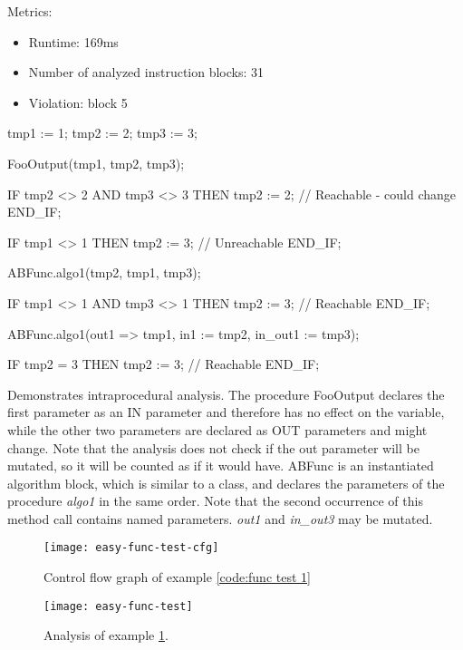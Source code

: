 Metrics:
\begin{itemize}
	\item Runtime: 169ms
	\item Number of analyzed instruction blocks: 31
	\item Violation: block 5
\end{itemize}


\begin{program}
	\begin{GenericCode}
tmp1 := 1;
tmp2 := 2;
tmp3 := 3;

FooOutput(tmp1, tmp2, tmp3);

IF tmp2 <> 2 AND tmp3 <> 3 THEN
	tmp2 := 2; // Reachable - could change
END_IF;

IF tmp1 <> 1 THEN
	tmp2 := 3; // Unreachable
END_IF;

ABFunc.algo1(tmp2, tmp1, tmp3);

IF tmp1 <> 1 AND tmp3 <> 1 THEN
	tmp2 := 3; // Reachable
END_IF;

ABFunc.algo1(out1 => tmp1, in1 := tmp2, in_out1 := tmp3);

IF tmp2 = 3 THEN
	tmp2 := 3; // Reachable
END_IF;	\end{GenericCode}
	\centering
	\caption{Demonstrates intraprocedural analysis. The procedure  FooOutput declares the first parameter as an IN parameter and therefore has no effect on the variable, while the other two parameters are declared as OUT parameters and might change. Note that the analysis does not check if the out parameter will be mutated, so it will be counted as if it would have. ABFunc is an instantiated algorithm block, which is similar to a class, and declares the parameters of the procedure \emph{algo1} in the same order. Note that the second occurrence of this method call contains named parameters. \emph{out1} and \emph{in\_out3} may be mutated.}
	\label{code:func test 1}
\end{program}
\begin{figure}
	\centering
	\texttt{[image: easy-func-test-cfg]}
	\caption{Control flow graph of example \ref{code:func test 1}}
	\label{fig:func test 1 cfg}
\end{figure}
\begin{figure}
	\centering
	\texttt{[image: easy-func-test]}
	\caption{Analysis of example \ref{fig:func test 1 cfg}.}
	\label{fig:func test 1}
\end{figure}

